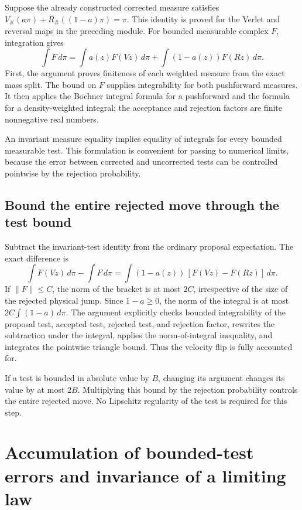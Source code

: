 \documentclass[11pt,a4paper]{report}
\begin{document}
Suppose the already constructed corrected measure satisfies \(V_\#(a\pi)+R_\#((1-a)\pi)=\pi\). This identity is proved for the Verlet and reversal maps in the preceding module. For bounded measurable complex \(F\), integration gives \[\int F\,d\pi=\int a(z)F(Vz)\,d\pi+\int(1-a(z))F(Rz)\,d\pi.\] First, the argument proves finiteness of each weighted measure from the exact mass split. The bound on \(F\) supplies integrability for both pushforward measures. It then applies the Bochner integral formula for a pushforward and the formula for a density-weighted integral; the acceptance and rejection factors are finite nonnegative real numbers.



An invariant measure equality implies equality of integrals for every bounded measurable test. This formulation is convenient for passing to numerical limits, because the error between corrected and uncorrected tests can be controlled pointwise by the rejection probability.

\subsection{\texorpdfstring{Bound the entire rejected move through the test bound}{Bound the entire rejected move through the test bound}}
\label{report-step-KineticLangevin-HamiltonianTests-lean-3}


Subtract the invariant-test identity from the ordinary proposal expectation. The exact difference is \[\int F(Vz)\,d\pi-\int F\,d\pi=\int(1-a(z))\,[F(Vz)-F(Rz)]\,d\pi.\] If \(\|F\|\le C\), the norm of the bracket is at most \(2C\), irrespective of the size of the rejected physical jump. Since \(1-a\ge0\), the norm of the integral is at most \(2C\int(1-a)\,d\pi\). The argument explicitly checks bounded integrability of the proposal test, accepted test, rejected test, and rejection factor, rewrites the subtraction under the integral, applies the norm-of-integral inequality, and integrates the pointwise triangle bound. Thus the velocity flip is fully accounted for.



If a test is bounded in absolute value by \(B\), changing its argument changes its value by at most \(2B\). Multiplying this bound by the rejection probability controls the entire rejected move. No Lipschitz regularity of the test is required for this step.

\section{\texorpdfstring{Accumulation of bounded-test errors and invariance of a limiting law}{Accumulation of bounded-test errors and invariance of a limiting law}}
\label{proof-module-KineticLangevin-HamiltonianIteration-lean}
\end{document}
